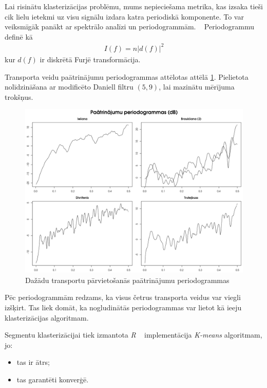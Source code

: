 \documentclass{ludis}
\begin{document}
Lai risinātu klasterizācijas problēmu, mums nepieciešama metrika, kas izsaka tieši cik lielu 
ietekmi uz visu signālu izdara katra periodiskā komponente. To var veiksmīgāk panākt ar 
spektrālo analīzi un periodogrammām. ~\cite{bloomfield2004} Periodogrammu definē kā
\begin{align*}
  I(f) = n | d(f) |^2
\end{align*}
kur $d(f)$ ir diskrētā Furjē transformācija.

Transporta veidu paātrinājumu periodogrammas attēlotas attēlā \ref{fig:periodograms}. Pielietota
\linebreak nolīdzināšana ar modificēto Daniell filtru $(5, 9)$, lai mazinātu mērījuma trokšņus.

\begin{figure}
  \centering
  \includegraphics[scale=0.5]{img/periodograms}
  \caption{Dažādu transportu pārvietošanās paātrinājumu periodogrammas}
  \label{fig:periodograms}
\end{figure}

Pēc periodogrammām redzams, ka visus četrus transporta veidus var viegli izšķirt. Tas liek domāt,
ka nogludinātās periodogrammas var lietot kā ieeju klasterizācijas algoritmam.

Segmentu klasterizācijai tiek izmantota \emph{R} ~\cite{Rcore} implementācija \emph{K-means} 
algoritmam, jo:
\begin{itemize}
\item tas ir ātrs;
\item tas garantēti konverģē.
\end{itemize}
\end{document}
